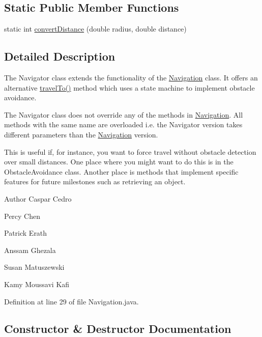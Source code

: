 \subsection*{Static Public Member Functions}
\begin{DoxyCompactItemize}
\item 
static int \hyperlink{classca_1_1mcgill_1_1ecse211_1_1project_1_1_navigation_ac9e260bcd619ffa4820d7d0de7ea1c12}{convert\+Distance} (double radius, double distance)
\end{DoxyCompactItemize}


\subsection{Detailed Description}
The Navigator class extends the functionality of the \hyperlink{classca_1_1mcgill_1_1ecse211_1_1project_1_1_navigation}{Navigation} class. It offers an alternative \hyperlink{classca_1_1mcgill_1_1ecse211_1_1project_1_1_navigation_ada8a324c1d391698164476d4d728f0c4}{travel\+To()} method which uses a state machine to implement obstacle avoidance.

The Navigator class does not override any of the methods in \hyperlink{classca_1_1mcgill_1_1ecse211_1_1project_1_1_navigation}{Navigation}. All methods with the same name are overloaded i.\+e. the Navigator version takes different parameters than the \hyperlink{classca_1_1mcgill_1_1ecse211_1_1project_1_1_navigation}{Navigation} version.

This is useful if, for instance, you want to force travel without obstacle detection over small distances. One place where you might want to do this is in the Obstacle\+Avoidance class. Another place is methods that implement specific features for future milestones such as retrieving an object.

\begin{DoxyAuthor}{Author}
Caspar Cedro 

Percy Chen 

Patrick Erath 

Anssam Ghezala 

Susan Matuszewski 

Kamy Moussavi Kafi 
\end{DoxyAuthor}


Definition at line 29 of file Navigation.\+java.



\subsection{Constructor \& Destructor Documentation}
\mbox{\label{classca_1_1mcgill_1_1ecse211_1_1project_1_1_navigation_aaee14b67c392ddd951e3ce21224c3e56}} 
